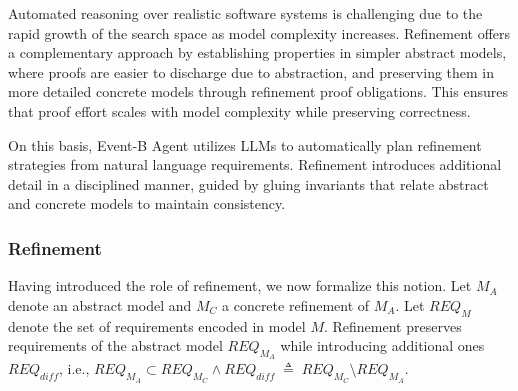 Automated reasoning over realistic software systems is challenging due to the rapid growth of the search space as model complexity increases.
Refinement offers a complementary approach by establishing properties in simpler abstract models, where proofs are easier to discharge due to abstraction, and preserving them in more detailed concrete models through refinement proof obligations.
This ensures that proof effort scales with model complexity while preserving correctness.

On this basis, Event-B Agent utilizes LLMs to automatically plan refinement strategies from natural language requirements. 
Refinement introduces additional detail in a disciplined manner, guided by gluing invariants that relate abstract and concrete models to maintain consistency.

\subsubsection{Refinement} \label{sec:refinement}

Having introduced the role of refinement, we now formalize this notion.
Let $M_A$ denote an abstract model and $M_C$ a concrete refinement of $M_A$.
Let $REQ_{M}$ denote the set of requirements encoded in model $M$.
Refinement preserves requirements of the abstract model $REQ_{M_A}$ while introducing additional ones $REQ_{\mathit{diff}}$, i.e.,
\(
REQ_{M_A} \subset REQ_{M_C}
\wedge
REQ_{\mathit{diff}} \;\triangleq\; REQ_{M_C} \setminus REQ_{M_A}
\).





